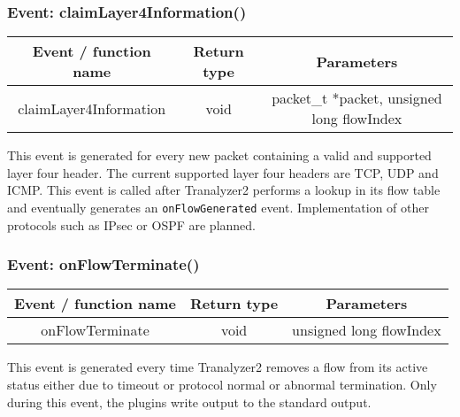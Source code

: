\documentclass[documentation]{subfiles}
\begin{document}

\subsubsection{Event: claimLayer4Information()}
\begin{longtable}{ccc}
    \toprule
    {\bf Event / function name} & {\bf Return type} & {\bf Parameters} \\
    \midrule\endhead%
    claimLayer4Information & void & packet\_t *packet, unsigned long flowIndex \\
    \bottomrule
\end{longtable}
This event is generated for every new packet containing a valid and supported layer four header. The current supported layer four headers are TCP, UDP and ICMP. This event is called after Tranalyzer2 performs a lookup in its flow table and eventually generates an {\tt onFlowGenerated} event. Implementation of other protocols such as IPsec or OSPF are planned.

\subsubsection{Event: onFlowTerminate()}\label{event:onFlowTerminate}
\begin{longtable}{ccc}
    \toprule
    {\bf Event / function name} & {\bf Return type} & {\bf Parameters} \\
    \midrule\endhead%
    onFlowTerminate & void & unsigned long flowIndex \\
    \bottomrule
\end{longtable}
This event is generated every time Tranalyzer2 removes a flow from its active status either due to timeout or protocol normal or abnormal termination. Only during this event, the plugins write output to the standard output.
\end{document}
